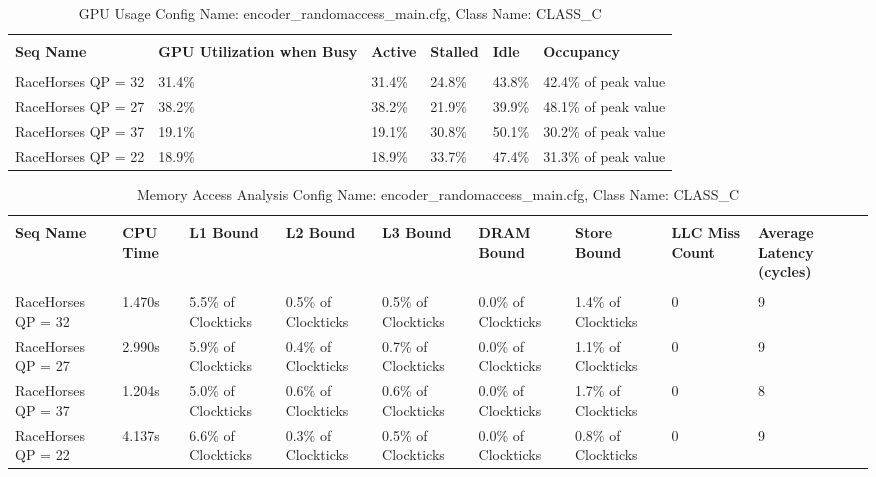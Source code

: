 \documentclass{article}%
\begin{document}
\newpage%
\begin{longtabu}{| X[l] | X[l] | X[l] | X[l] | X[l] | X[l] |}%
\caption{%
GPU Usage\newline%
 Config Name: encoder\_randomaccess\_main.cfg,\newline%
 Class Name: CLASS\_C\newline%
%
}%
\hline%
&&&&&\\%
\textbf{Seq Name}&\textbf{GPU Utilization when Busy}&\textbf{Active}&\textbf{Stalled}&\textbf{Idle}&\textbf{Occupancy}\\%
&&&&&\\%
\hline%
\endhead%
RaceHorses\newline%
 QP = 32&31.4\%&31.4\%&24.8\%&43.8\%&42.4\% of peak value\\%
\hline%
RaceHorses\newline%
 QP = 27&38.2\%&38.2\%&21.9\%&39.9\%&48.1\% of peak value\\%
\hline%
RaceHorses\newline%
 QP = 37&19.1\%&19.1\%&30.8\%&50.1\%&30.2\% of peak value\\%
\hline%
RaceHorses\newline%
 QP = 22&18.9\%&18.9\%&33.7\%&47.4\%&31.3\% of peak value\\%
\hline%
\end{longtabu}%
\begin{longtabu}{| X[l] | X[l] | X[l] | X[l] | X[l] | X[l] | X[l] | X[l] | X[l] |}%
\caption{%
Memory Access Analysis\newline%
 Config Name: encoder\_randomaccess\_main.cfg,\newline%
 Class Name: CLASS\_C\newline%
%
}%
\hline%
&&&&&&&&\\%
\textbf{Seq Name}&\textbf{CPU Time}&\textbf{L1 Bound}&\textbf{L2 Bound}&\textbf{L3 Bound}&\textbf{DRAM Bound}&\textbf{Store Bound}&\textbf{LLC Miss Count}&\textbf{Average Latency (cycles)}\\%
&&&&&&&&\\%
\hline%
\endhead%
RaceHorses\newline%
 QP = 32&1.470s&5.5\% of Clockticks&0.5\% of Clockticks&0.5\% of Clockticks&0.0\% of Clockticks&1.4\% of Clockticks&0&9\\%
\hline%
RaceHorses\newline%
 QP = 27&2.990s&5.9\% of Clockticks&0.4\% of Clockticks&0.7\% of Clockticks&0.0\% of Clockticks&1.1\% of Clockticks&0&9\\%
\hline%
RaceHorses\newline%
 QP = 37&1.204s&5.0\% of Clockticks&0.6\% of Clockticks&0.6\% of Clockticks&0.0\% of Clockticks&1.7\% of Clockticks&0&8\\%
\hline%
RaceHorses\newline%
 QP = 22&4.137s&6.6\% of Clockticks&0.3\% of Clockticks&0.5\% of Clockticks&0.0\% of Clockticks&0.8\% of Clockticks&0&9\\%
\hline%
\end{longtabu}%
\end{document}
